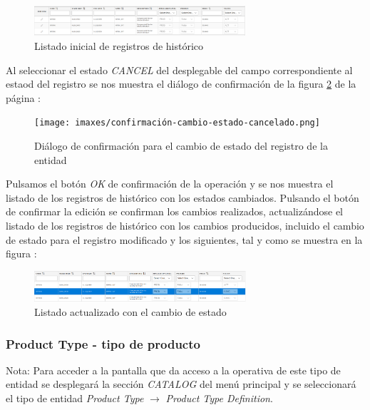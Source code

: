 \begin{figure}[H]
  \centering
  \includegraphics[width=0.70\textwidth]{imaxes/listado-tipos-cuotas-inicial.png}
  \caption{Listado inicial de registros de histórico}
  \label{fig:listado-tipos-cuotas-inicial}
\end{figure}


Al seleccionar el estado \emph{CANCEL} del desplegable del campo correspondiente al estaod del registro se nos muestra el diálogo de confirmación de la figura \ref{fig:confirmación-cambio-estado-cancelado} de la página \pageref{fig:confirmación-cambio-estado-cancelado}:

\begin{figure}[H]
  \centering
  \texttt{[image: imaxes/confirmación-cambio-estado-cancelado.png]}
  \caption{Diálogo de confirmación para el cambio de estado del registro de la entidad}
  \label{fig:confirmación-cambio-estado-cancelado}
\end{figure}


Pulsamos el botón \emph{OK} de confirmación de la operación y se nos muestra el listado de los registros de histórico con los estados cambiados. Pulsando el botón de confirmar la edición se confirman los cambios realizados, actualizándose el listado de los registros de histórico con los cambios producidos, incluido el cambio de estado para el registro modificado y los siguientes, tal y como se muestra en la figura :

\begin{figure}[H]
  \centering
  \includegraphics[width=0.70\textwidth]{imaxes/cambio-estado-cancelado.png}
  \caption{Listado actualizado con el cambio de estado}
  \label{fig:cambio-estado-cancelado}
\end{figure}




\subsubsection{Product Type - tipo de producto}
\label{sub:product-type}

Nota: Para acceder a la pantalla que da acceso a la operativa de este tipo de entidad se desplegará la sección \emph{CATALOG} del menú principal y se seleccionará el tipo de entidad \emph{Product Type} $\rightarrow$ \emph{Product Type Definition}.

